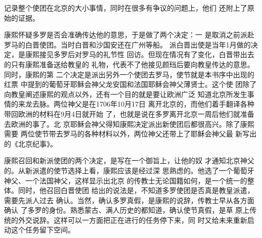 记录整个使团在北京的大小事情，同时在很多有争议的问题上，他们%
还附上了原始的证据。%
\par
康熙怀疑多罗是否会准确传达他的意思，于是做了两个决定：一%
是取消之前派赴罗马的白晋使团。当时白晋和沙国安还在广州等船。%
派白晋出使是当年1月做的决定，是康熙接见多罗后对罗马的礼节性%
回访。但现在情况有了变化，白晋带出去的只有康熙准备送给教皇的%
礼物，代表不了他接见颜珰后要向教皇传达的意思。同时，康熙的第%
二个决定是派出另外一个使团去罗马，使节就是本书序中出现的红票%
中提到的葡萄牙耶稣会神父龙安国和法国耶稣会神父薄贤士。这个使%
团除了向教皇阐述康熙的观点以外，还有一个目的就是要让欧洲广泛%
知道北京所发生事情的来龙去脉。两位神父是在1706年10月17日%
离开北京的，而他们着手翻译各种带回欧洲的材料在9月4日就开始%
了，也就是说在多罗离开北京一周后他们就准备去欧洲的事了。北%
京耶稣会神父得知康熙决定派出新使团后都很高兴。除了康熙需要%
两位使节带去罗马的各种材料以外，两位神父还带上了耶稣会神父最%
新写出的《北京纪事》。%
\par
康熙召回和新派使团的两个决定，是写在一个御旨上，让他的奴%
才通知北京神父的。从新派遣的使节选择上看，康熙应该是经过深%
思熟虑的。他选了一个葡萄牙神父、一个法国神父，这样显示出北京%
的传教士无论国籍如何，是一个统一的整体。同时，他召回白晋使团%
给出的说法是，不知道多罗使团是否真是教皇派遣，需要先派人过去%
确认。当然，确认多罗真假，是康熙的说辞，传教士早从各方面确认%
了多罗的身份。熟悉蒙古、满人历史的都知道，确认使节真假，是草%
原上传统的外交说辞。这样可以一方面把正在进行的任务停下来，同%
时又给未来重新启动这个任务留下空间。%
